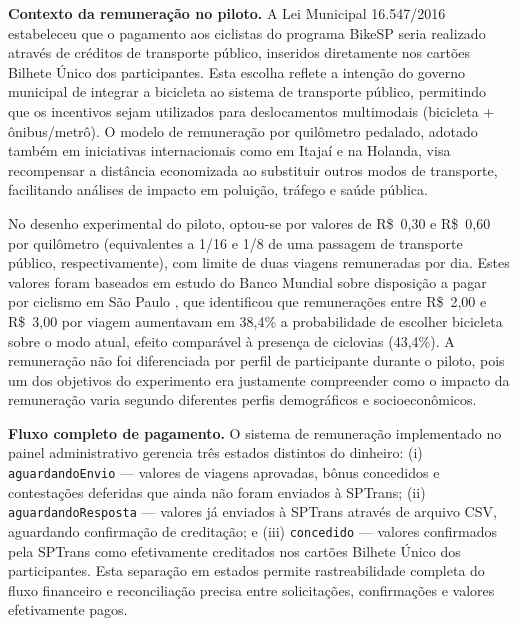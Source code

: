

\textbf{Contexto da remuneração no piloto.} A Lei Municipal 16.547/2016 estabeleceu
que o pagamento aos ciclistas do programa BikeSP seria realizado através de créditos
de transporte público, inseridos diretamente nos cartões Bilhete Único dos
participantes. Esta escolha reflete a intenção do governo municipal de integrar a
bicicleta ao sistema de transporte público, permitindo que os incentivos sejam
utilizados para deslocamentos multimodais (bicicleta + ônibus/metrô). O modelo de
remuneração por quilômetro pedalado, adotado também em iniciativas internacionais
como em Itajaí e na Holanda, visa recompensar a distância economizada ao
substituir outros modos de transporte, facilitando análises de impacto em poluição,
tráfego e saúde pública.

No desenho experimental do piloto, optou-se por valores de R\$~0,30 e R\$~0,60 por
quilômetro (equivalentes a 1/16 e 1/8 de uma passagem de transporte público,
respectivamente), com limite de duas viagens remuneradas por dia. Estes valores foram
baseados em estudo do Banco Mundial sobre disposição a pagar por ciclismo em São
Paulo \citep{worldbank2022}, que identificou que remunerações entre R\$~2,00 e R\$~3,00 por viagem
aumentavam em 38,4\% a probabilidade de escolher bicicleta sobre o modo atual,
efeito comparável à presença de ciclovias (43,4\%). A remuneração não foi
diferenciada por perfil de participante durante o piloto, pois um dos objetivos do
experimento era justamente compreender como o impacto da remuneração varia
segundo diferentes perfis demográficos e socioeconômicos.

\textbf{Fluxo completo de pagamento.} O sistema de remuneração implementado no
painel administrativo gerencia três estados distintos do dinheiro: (i)
\texttt{aguardandoEnvio} --- valores de viagens aprovadas, bônus concedidos e
contestações deferidas que ainda não foram enviados à SPTrans; (ii)
\texttt{aguardandoResposta} --- valores já enviados à SPTrans através de arquivo
CSV, aguardando confirmação de creditação; e (iii) \texttt{concedido} --- valores
confirmados pela SPTrans como efetivamente creditados nos cartões Bilhete Único dos
participantes. Esta separação em estados permite rastreabilidade completa do fluxo
financeiro e reconciliação precisa entre solicitações, confirmações e valores
efetivamente pagos.

